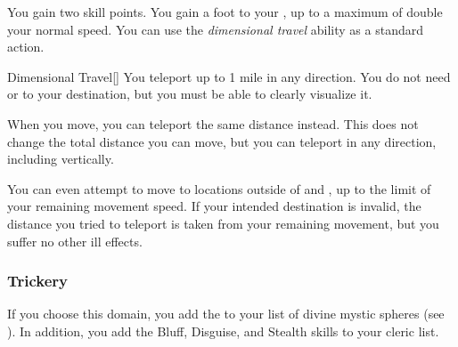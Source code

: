              You gain two skill points.
             You gain a  foot  to your , up to a maximum of double your normal speed.
             You can use the \textit{dimensional travel} ability as a standard action.
            \begin{freeability}{Dimensional Travel}[]
                You teleport up to 1 mile in any direction.
                You do not need  or  to your destination, but you must be able to clearly visualize it.
            \end{freeability}
             When you move, you can teleport the same distance instead.
            This does not change the total distance you can move, but you can teleport in any direction, including vertically.

            You can even attempt to move to locations outside of  and , up to the limit of your remaining movement speed.
            If your intended destination is invalid, the distance you tried to teleport is taken from your remaining movement, but you suffer no other ill effects.

        \subsubsection{Trickery}
            If you choose this domain, you add the   to your list of divine mystic spheres (see ).
            In addition, you add the Bluff, Disguise, and Stealth skills to your cleric  list.

